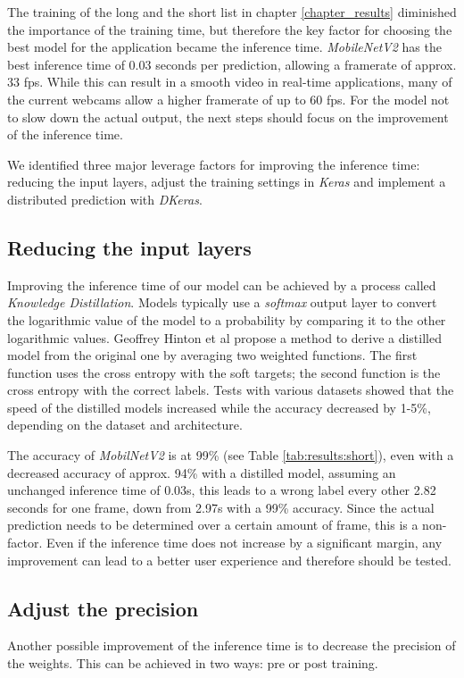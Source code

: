 The training of the long and the short list in chapter \ref{chapter_results} diminished the importance of the training time, but therefore the key factor for choosing the best model for the application became the inference time. \textit{MobileNetV2} has the best inference time of 0.03 seconds per prediction, allowing a framerate of approx. 33 fps. While this can result in a smooth video in real-time applications, many of the current webcams allow a higher framerate of up to 60 fps. For the model not to slow down the actual output, the next steps should focus on the improvement of the inference time.

We identified three major leverage factors for improving the inference time: reducing the input layers, adjust the training settings in \textit{Keras} and implement a distributed prediction with \textit{DKeras}.

\subsection{Reducing the input layers}\label{chapter_distill}
Improving the inference time of our model can be achieved by a process called \textit{Knowledge Distillation}\cite{hinton2015distilling}. Models typically use a \textit{softmax} output layer to convert the logarithmic value of the model to a probability by comparing it to the other logarithmic values. Geoffrey Hinton et al\cite{hinton2015distilling} propose a method to derive a distilled model from the original one by averaging two weighted functions. The first function uses the cross entropy with the soft targets; the second function is the cross entropy with the correct labels. Tests with various datasets showed that the speed of the distilled models increased while the accuracy decreased by 1-5\%, depending on the dataset and architecture.

The accuracy of \textit{MobilNetV2} is at 99\% (see Table \ref{tab:results:short}), even with a decreased accuracy of approx. 94\% with a distilled model, assuming an unchanged inference time of 0.03s, this leads to a wrong label every other 2.82 seconds for one frame, down from 2.97s with a 99\% accuracy. Since the actual prediction needs to be determined over a certain amount of frame, this is a non-factor. Even if the inference time does not increase by a significant margin, any improvement can lead to a better user experience and therefore should be tested.

\subsection{Adjust the precision}
Another possible improvement of the inference time is to decrease the precision of the weights. This can be achieved in two ways: pre or post training.

